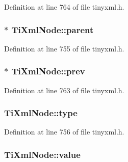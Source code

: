Definition at line 764 of file tinyxml.h.

\hypertarget{class_ti_xml_node_a662c4de61244e4fa5bd4e2d8c63143a5}{
\subsubsection[{parent}]{$\ast$ {\bf TiXmlNode::parent}}}
\label{class_ti_xml_node_a662c4de61244e4fa5bd4e2d8c63143a5}


Definition at line 755 of file tinyxml.h.

\hypertarget{class_ti_xml_node_a9c5370ea2cbfd9f0e0f7b30a57fd68f5}{
\subsubsection[{prev}]{$\ast$ {\bf TiXmlNode::prev}}}
\label{class_ti_xml_node_a9c5370ea2cbfd9f0e0f7b30a57fd68f5}


Definition at line 763 of file tinyxml.h.

\hypertarget{class_ti_xml_node_a2619c6379181c16ba95ae6922e2ca839}{
\subsubsection[{type}]{ {\bf TiXmlNode::type}}}
\label{class_ti_xml_node_a2619c6379181c16ba95ae6922e2ca839}


Definition at line 756 of file tinyxml.h.

\hypertarget{class_ti_xml_node_ab068eb0e3311ba1b5a132abe60a9c3c8}{
\subsubsection[{value}]{ {\bf TiXmlNode::value}}}
\label{class_ti_xml_node_ab068eb0e3311ba1b5a132abe60a9c3c8}



